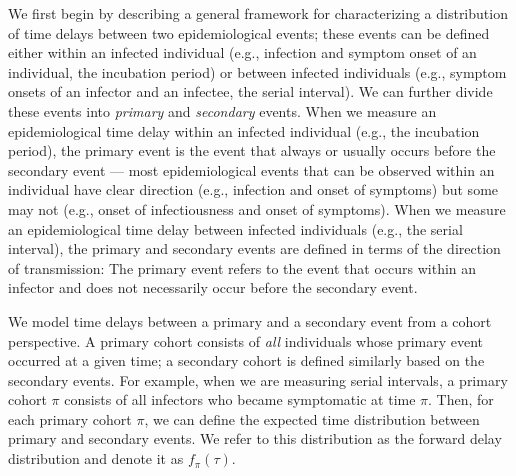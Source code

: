 \documentclass[12pt]{article}
\newcommand{\comment}{\showcomment}
\newcommand{\showcomment}[3]{\textcolor{#1}{\textbf{[#2: }\textsl{#3}\textbf{]}}}
\newcommand{\jd}[1]{\comment{cyan}{JD}{#1}}
\begin{document}
We first begin by describing a general framework for characterizing a distribution of time delays between two epidemiological events;
these events can be defined either within an infected individual (e.g., infection and symptom onset of an individual, the incubation period) or between infected individuals (e.g., symptom onsets of an infector and an infectee, the serial interval).
We can further divide these events into \emph{primary} and \emph{secondary} events.
When we measure an epidemiological time delay within an infected individual (e.g., the incubation period), the primary event is the event that always or usually occurs before the secondary event ---
most epidemiological events that can be observed within an individual have clear direction (e.g., infection and onset of symptoms) but some may not (e.g., onset of infectiousness and onset of symptoms).
When we measure an epidemiological time delay between infected individuals (e.g., the serial interval), 
the primary and secondary events are defined in terms of the direction of transmission:
The primary event refers to the event that occurs within an infector and does not necessarily occur before the secondary event.

We model time delays between a primary and a secondary event from a cohort perspective.
A primary cohort consists of \emph{all} individuals whose primary event occurred at a given time; 
a secondary cohort is defined similarly based on the secondary events.
For example, when we are measuring serial intervals, a primary cohort $\pi$ consists of all infectors who became symptomatic at time $\pi$.
Then, for each primary cohort $\pi$, we can define the expected time distribution between primary and secondary events.
We refer to this distribution as the forward delay distribution and denote it as $f_\pi(\tau)$.
\end{document}
